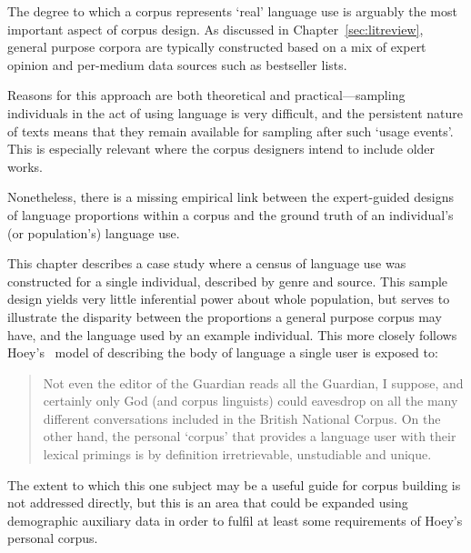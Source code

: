 The degree to which a corpus represents `real' language use is arguably the most important aspect of corpus design.  As discussed in Chapter~\ref{sec:litreview}, general purpose corpora are typically constructed based on a mix of expert opinion and per-medium data sources such as bestseller lists.


Reasons for this approach are both theoretical and practical---sampling individuals in the act of using language is very difficult, and the persistent nature of texts means that they remain available for sampling after such `usage events'.  This is especially relevant where the corpus designers intend to include older works.

Nonetheless, there is a missing empirical link between the expert-guided designs of language proportions within a corpus and the ground truth of an individual's (or population's) language use.

This chapter describes a case study where a census of language use was constructed for a single individual, described by genre and source.  This sample design yields very little inferential power about whole population, but serves to illustrate the disparity between the proportions a general purpose corpus may have, and the language used by an example individual.  This more closely follows Hoey's~\cite[p.14]{hoey2005lexical} model of describing the body of language a single user is exposed to:

\begin{quote}
Not even the editor of the Guardian reads all the Guardian, I suppose, and certainly only God (and corpus linguists) could eavesdrop on all the many different conversations included in the British National Corpus.  On the other hand, the personal `corpus' that provides a language user with their lexical primings is by definition irretrievable, unstudiable and unique.
\end{quote}

The extent to which this one subject may be a useful guide for corpus building is not addressed directly, but this is an area that could be expanded using demographic auxiliary data in order to fulfil at least some requirements of Hoey's personal corpus.

